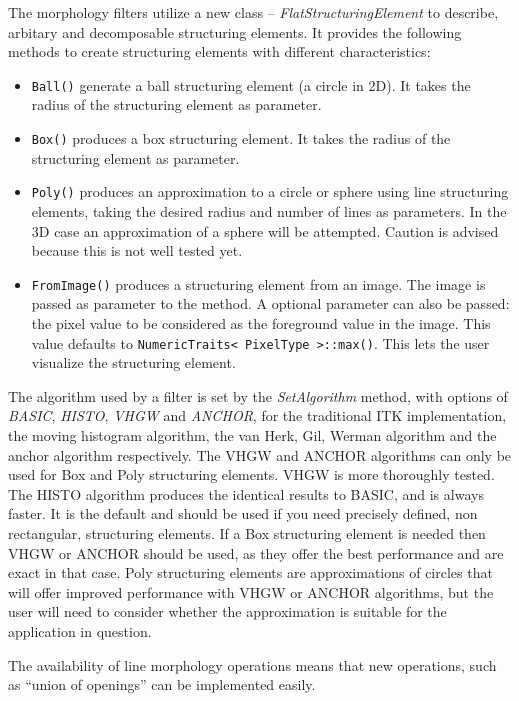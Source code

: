 \documentclass{InsightArticle}
\begin{document}
The morphology filters utilize a new class -- {\em
FlatStructuringElement} to describe, arbitary and decomposable
structuring elements. It provides the following methods to create
structuring elements with different characteristics:
\begin{itemize}
  \item \verb$Ball()$ generate a ball structuring element (a circle in 2D). It takes the 
	radius of the structuring element as parameter.
  \item \verb$Box()$ produces a box structuring element. It takes the radius 
	of the structuring element as parameter.
  \item \verb$Poly()$ produces an approximation to a circle or sphere using 
	line structuring elements, taking the desired radius and number of 
	lines as parameters. In the 3D case an approximation of a sphere will 
	be attempted. Caution is advised because this is not well tested yet.
  \item \verb$FromImage()$ produces a structuring element from an image. The image is passed
as parameter to the method. A optional parameter can also be passed: the pixel value
to be considered as the foreground value in the image. This value defaults to
\verb$NumericTraits< PixelType >::max()$. This lets the user visualize the structuring element.
\end{itemize}

The algorithm used by a filter is set by the {\em SetAlgorithm}
method, with options of {\em BASIC}, {\em HISTO}, {\em VHGW} and {\em
ANCHOR}, for the traditional ITK implementation, the moving histogram
algorithm, the van Herk, Gil, Werman algorithm and the anchor
algorithm respectively. The VHGW and ANCHOR algorithms can only be
used for Box and Poly structuring elements. VHGW is more thoroughly
tested. The HISTO algorithm produces the identical results to BASIC,
and is always faster. It is the default and should be used if you need
precisely defined, non rectangular, structuring elements. If a Box
structuring element is needed then VHGW or ANCHOR should be used, as
they offer the best performance and are exact in that case. Poly
structuring elements are approximations of circles that will offer
improved performance with VHGW or ANCHOR algorithms, but the user will
need to consider whether the approximation is suitable for the
application in question.

The availability of line morphology operations means that new
operations, such as ``union of openings'' can be implemented easily.
\end{document}
